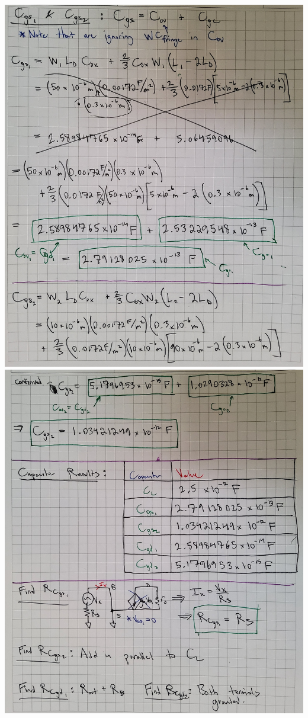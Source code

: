 \documentclass[12pt, fleqn]{article}
\begin{document}
\newpage
\includegraphics[scale=0.165, angle=90, center]{p1_4.jpg}\\
\newpage
\includegraphics[scale=0.165, angle=90, center]{p1_5.jpg}\\
\end{document}
